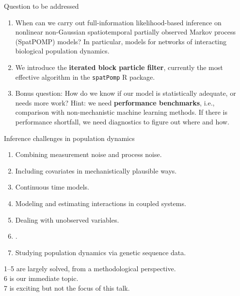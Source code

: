 \documentclass{beamer}
\begin{document}
\begin{frame}{Question to be addressed}

  \begin{enumerate}
  \item When can we carry out full-information likelihood-based inference on nonlinear non-Gaussian spatiotemporal partially observed Markov process (SpatPOMP) models? In particular, models for networks of interacting biological population dynamics.

        \vspace{2mm}

\item We introduce the {\bf iterated block particle filter}, currently the most effective algorithm in the \texttt{spatPomp} R package.

\vspace{2mm}

\item Bonus question: How do we know if our model is statistically adequate, or needs more work? Hint: we need {\bf performance benchmarks}, i.e., comparison with non-mechanistic machine learning methods. If there is performance shortfall, we need diagnostics to figure out where and how.
  
    \end{enumerate}
\end{frame}

\newcommand\challengeSep{\vspace{3mm}}

\begin{frame}{Inference challenges in population dynamics}

  \begin{enumerate}
\item Combining measurement noise and process noise.
\item Including covariates in mechanistically plausible ways.
\item  Continuous time models.
\item  Modeling and estimating interactions in coupled systems.
\item  Dealing with unobserved variables.
\item  {}.
\item  Studying population dynamics via genetic sequence data.
  \end{enumerate}

  \vspace{4mm}
  
  1--5 are largely solved, from a methodological perspective.\\
  6 is our immediate topic.\\
  7 is exciting but not the focus of this talk.


  \vspace{4mm}

  
\end{frame}
\end{document}
